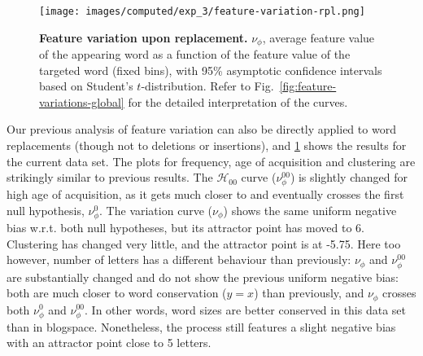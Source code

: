 \begin{figure}[!ht]
  \centering
  \texttt{[image: images/computed/exp\_3/feature-variation-rpl.png]}
  \caption[Feature variation upon replacement]{
  \textbf{Feature variation upon replacement.}
  $\nu_{\phi}$, average feature value of the appearing word as a function of the feature value of the targeted word (fixed bins), with 95\% asymptotic confidence intervals based on Student's $t$-distribution.
  Refer to Fig.~\ref{fig:feature-variations-global} for the detailed interpretation of the curves.
  }
  \label{fig:gistr-variation-rpl}
\end{figure}

Our previous analysis of feature variation can also be directly applied
to word replacements (though not to deletions or insertions), and
\cref{fig:gistr-variation-rpl} shows the results for the current data
set. The plots for frequency, age of acquisition and clustering are
strikingly similar to previous results. The \(\mathcal{H}_{00}\) curve
(\(\nu_{\phi}^{00}\)) is slightly changed for high age of acquisition,
as it gets much closer to and eventually crosses the first null
hypothesis, \(\nu_{\phi}^0\). The variation curve (\(\nu_{\phi}\)) shows
the same uniform negative bias w.r.t. both null hypotheses, but its
attractor point has moved to 6. Clustering has changed very little, and
the attractor point is at -5.75. Here too however, number of letters has
a different behaviour than previously: \(\nu_{\phi}\) and
\(\nu_{\phi}^{00}\) are substantially changed and do not show the
previous uniform negative bias: both are much closer to word
conservation (\(y = x\)) than previously, and \(\nu_{\phi}\) crosses
both \(\nu_{\phi}^0\) and \(\nu_{\phi}^{00}\). In other words, word
sizes are better conserved in this data set than in blogspace.
Nonetheless, the process still features a slight negative bias with an
attractor point close to 5 letters.


